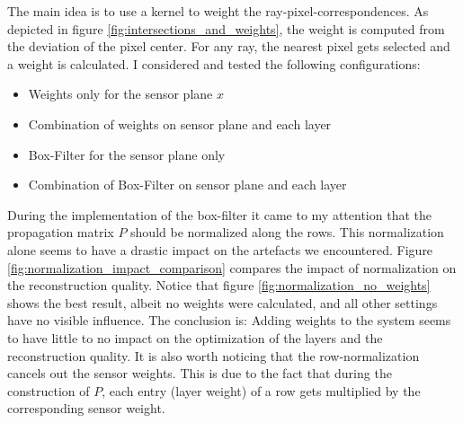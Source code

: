 \documentclass[11pt,a4paper,titlepage]{article}
\begin{document}
The main idea is to use a kernel to weight the ray-pixel-correspondences. As depicted in figure \ref{fig:intersections_and_weights}, the weight is computed from the deviation of the pixel center. For any ray, the nearest pixel gets selected and a weight is calculated. I considered and tested the following configurations:

\begin{itemize}
	\item 	Weights only for the sensor plane $x$
	\item 	Combination of weights on sensor plane and each layer
	\item 	Box-Filter for the sensor plane only
	\item	Combination of Box-Filter on sensor plane and each layer
\end{itemize}

During the implementation of the box-filter it came to my attention that the propagation matrix $P$ should be normalized along the rows. This normalization alone seems to have a drastic impact on the artefacts we encountered. Figure \ref{fig:normalization_impact_comparison} compares the impact of normalization on the reconstruction quality. Notice that figure \ref{fig:normalization_no_weights} shows the best result, albeit no weights were calculated, and all other settings have no visible influence. The conclusion is: Adding weights to the system seems to have little to no impact on the optimization of the layers and the reconstruction quality. 
\newline
It is also worth noticing that the row-normalization cancels out the sensor weights. This is due to the fact that during the construction of $P$, each entry (layer weight) of a row gets multiplied by the corresponding sensor weight.
\end{document}
